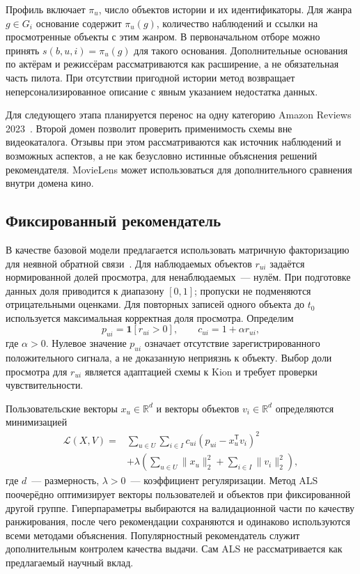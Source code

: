 \documentclass{misisarticle}
\begin{document}
Профиль включает $\pi_u$, число объектов истории и их идентификаторы. Для жанра $g\in G_i$ основание содержит $\pi_u(g)$, количество наблюдений и ссылки на просмотренные объекты с этим жанром. В первоначальном отборе можно принять $s(b,u,i)=\pi_u(g)$ для такого основания. Дополнительные основания по актёрам и режиссёрам рассматриваются как расширение, а не обязательная часть пилота. При отсутствии пригодной истории метод возвращает неперсонализированное описание с явным указанием недостатка данных.

Для следующего этапа планируется перенос на одну категорию Amazon Reviews 2023~\cite{amazon}. Второй домен позволит проверить применимость схемы вне видеокаталога. Отзывы при этом рассматриваются как источник наблюдений и возможных аспектов, а не как безусловно истинные объяснения решений рекомендателя. MovieLens может использоваться для дополнительного сравнения внутри домена кино.

\subsection{Фиксированный рекомендатель}

В качестве базовой модели предлагается использовать матричную факторизацию для неявной обратной связи~\cite{als}. Для наблюдаемых объектов $r_{ui}$ задаётся нормированной долей просмотра, для ненаблюдаемых~--- нулём. При подготовке данных доля приводится к диапазону $[0,1]$; пропуски не подменяются отрицательными оценками. Для повторных записей одного объекта до $t_0$ используется максимальная корректная доля просмотра. Определим
\begin{equation}
 p_{ui}=\mathbf{1}[r_{ui}>0],\qquad c_{ui}=1+\alpha r_{ui},
 \label{eq:implicit}
\end{equation}
где $\alpha>0$. Нулевое значение $p_{ui}$ означает отсутствие зарегистрированного положительного сигнала, а не доказанную неприязнь к объекту. Выбор доли просмотра для $r_{ui}$ является адаптацией схемы к Kion и требует проверки чувствительности.

Пользовательские векторы $x_u\in\mathbb{R}^d$ и векторы объектов $v_i\in\mathbb{R}^d$ определяются минимизацией
\begin{equation}
 \begin{aligned}
 \mathcal{L}(X,V)={}&\sum_{u\in U}\sum_{i\in I}
 c_{ui}(p_{ui}-x_u^{\mathsf T}v_i)^2\\
 &+\lambda\left(\sum_{u\in U}\|x_u\|_2^2
                  +\sum_{i\in I}\|v_i\|_2^2\right),
 \end{aligned}
 \label{eq:als}
\end{equation}
где $d$~--- размерность, $\lambda>0$~--- коэффициент регуляризации. Метод ALS поочерёдно оптимизирует векторы пользователей и объектов при фиксированной другой группе. Гиперпараметры выбираются на валидационной части по качеству ранжирования, после чего рекомендации сохраняются и одинаково используются всеми методами объяснения. Популярностный рекомендатель служит дополнительным контролем качества выдачи. Сам ALS не рассматривается как предлагаемый научный вклад.
\end{document}
